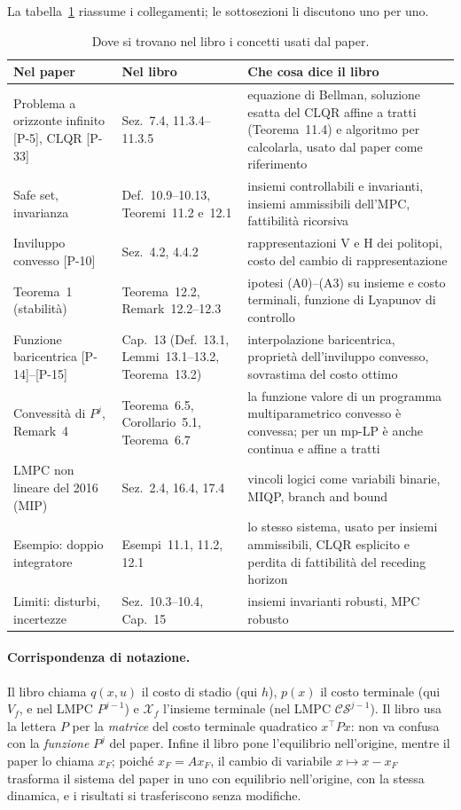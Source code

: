 \documentclass[11pt,a4paper]{article}
\theoremstyle{definition}
\theoremstyle{plain}
\theoremstyle{remark}
\newcommand{\Xf}{\mathcal{X}_f}
\newcommand{\CS}{\mathcal{CS}}
\newcommand{\eqp}[1]{\textup{[P-#1]}}   %
\begin{document}
La tabella~\ref{tab:mappa} riassume i collegamenti; le sottosezioni li
discutono uno per uno.

\begin{table}[h]
\centering
\caption{Dove si trovano nel libro i concetti usati dal paper.}\label{tab:mappa}
\small
\begin{tabular}{p{4.1cm}p{3.6cm}p{6.6cm}}
\toprule
Nel paper & Nel libro & Che cosa dice il libro \\
\midrule
Problema a orizzonte infinito \eqp{5}, CLQR \eqp{33}
  & Sez.~7.4, 11.3.4--11.3.5
  & equazione di Bellman, soluzione esatta del CLQR affine a tratti
    (Teorema~11.4) e algoritmo per calcolarla, usato dal paper come
    riferimento \\
Safe set, invarianza
  & Def.~10.9--10.13, Teoremi~11.2 e~12.1
  & insiemi controllabili e invarianti, insiemi ammissibili dell'MPC,
    fattibilità ricorsiva \\
Inviluppo convesso \eqp{10}
  & Sez.~4.2, 4.4.2
  & rappresentazioni V e H dei politopi, costo del cambio di
    rappresentazione \\
Teorema~1 (stabilità)
  & Teorema~12.2, Remark~12.2--12.3
  & ipotesi (A0)--(A3) su insieme e costo terminali, funzione di Lyapunov
    di controllo \\
Funzione baricentrica \eqp{14}--\eqp{15}
  & Cap.~13 (Def.~13.1, Lemmi~13.1--13.2, Teorema~13.2)
  & interpolazione baricentrica, proprietà dell'inviluppo convesso,
    sovrastima del costo ottimo \\
Convessità di $P^j$, Remark~4
  & Teorema~6.5, Corollario~5.1, Teorema~6.7
  & la funzione valore di un programma multiparametrico convesso è
    convessa; per un mp-LP è anche continua e affine a tratti \\
LMPC non lineare del 2016 (MIP)
  & Sez.~2.4, 16.4, 17.4
  & vincoli logici come variabili binarie, MIQP, branch and bound \\
Esempio: doppio integratore
  & Esempi~11.1, 11.2, 12.1
  & lo stesso sistema, usato per insiemi ammissibili, CLQR esplicito e
    perdita di fattibilità del receding horizon \\
Limiti: disturbi, incertezze
  & Sez.~10.3--10.4, Cap.~15
  & insiemi invarianti robusti, MPC robusto \\
\bottomrule
\end{tabular}
\end{table}

\paragraph{Corrispondenza di notazione.}
Il libro chiama $q(x,u)$ il costo di stadio (qui $h$), $p(x)$ il costo
terminale (qui $V_f$, e nel LMPC $P^{j-1}$) e $\Xf$ l'insieme terminale (nel
LMPC $\CS^{j-1}$). Il libro usa la lettera $P$ per la \emph{matrice} del costo
terminale quadratico $x^\top Px$: non va confusa con la \emph{funzione} $P^j$
del paper. Infine il libro pone l'equilibrio nell'origine, mentre il paper lo
chiama $x_F$; poiché $x_F = Ax_F$, il cambio di variabile $x\mapsto x-x_F$
trasforma il sistema del paper in uno con equilibrio nell'origine, con la
stessa dinamica, e i risultati si trasferiscono senza modifiche.
\end{document}
